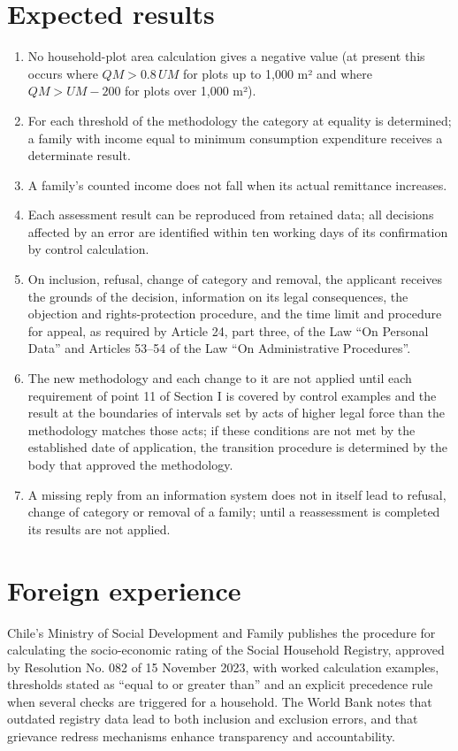 \documentclass[14pt,a4paper]{extarticle}
\begin{document}
\section{Expected results}
\begin{enumerate}[leftmargin=1.27cm]
\item No household-plot area calculation gives a negative value (at present this occurs where $QM>0.8\,UM$ for plots up to 1,000 m² and where $QM>UM-200$ for plots over 1,000 m²).
\item For each threshold of the methodology the category at equality is determined; a family with income equal to minimum consumption expenditure receives a determinate result.
\item A family’s counted income does not fall when its actual remittance increases.
\item Each assessment result can be reproduced from retained data; all decisions affected by an error are identified within ten working days of its confirmation by control calculation.
\item On inclusion, refusal, change of category and removal, the applicant receives the grounds of the decision, information on its legal consequences, the objection and rights-protection procedure, and the time limit and procedure for appeal, as required by Article 24, part three, of the Law “On Personal Data” and Articles 53–54 of the Law “On Administrative Procedures”.
\item The new methodology and each change to it are not applied until each requirement of point 11 of Section I is covered by control examples and the result at the boundaries of intervals set by acts of higher legal force than the methodology matches those acts; if these conditions are not met by the established date of application, the transition procedure is determined by the body that approved the methodology.
\item A missing reply from an information system does not in itself lead to refusal, change of category or removal of a family; until a reassessment is completed its results are not applied.
\end{enumerate}

\section{Foreign experience}
Chile’s Ministry of Social Development and Family publishes the procedure for calculating the socio-economic rating of the Social Household Registry, approved by Resolution No. 082 of 15 November 2023, with worked calculation examples, thresholds stated as “equal to or greater than” and an explicit precedence rule when several checks are triggered for a household\cite{chile}. The World Bank notes that outdated registry data lead to both inclusion and exclusion errors, and that grievance redress mechanisms enhance transparency and accountability\cite{wb2025}.
\end{document}
